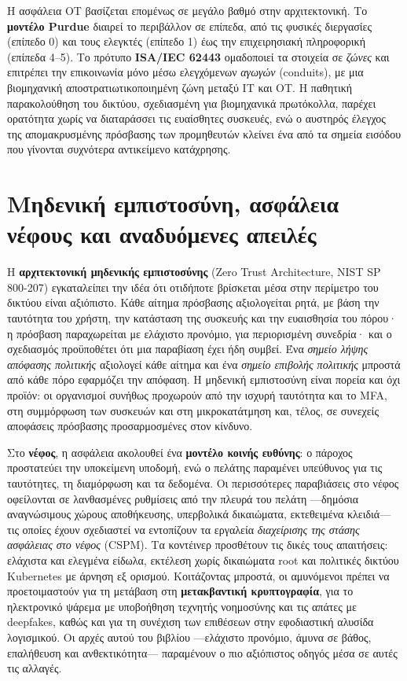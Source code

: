 Η ασφάλεια OT βασίζεται επομένως σε μεγάλο βαθμό στην αρχιτεκτονική. Το \textbf{μοντέλο Purdue} διαιρεί το περιβάλλον σε επίπεδα, από τις φυσικές διεργασίες (επίπεδο 0) και τους ελεγκτές (επίπεδο 1) έως την επιχειρησιακή πληροφορική (επίπεδα 4–5). Το πρότυπο \textbf{ISA/IEC 62443} ομαδοποιεί τα στοιχεία σε \emph{ζώνες} και επιτρέπει την επικοινωνία μόνο μέσω ελεγχόμενων \emph{αγωγών} (conduits), με μια βιομηχανική αποστρατιωτικοποιημένη ζώνη μεταξύ IT και OT. Η παθητική παρακολούθηση του δικτύου, σχεδιασμένη για βιομηχανικά πρωτόκολλα, παρέχει ορατότητα χωρίς να διαταράσσει τις ευαίσθητες συσκευές, ενώ ο αυστηρός έλεγχος της απομακρυσμένης πρόσβασης των προμηθευτών κλείνει ένα από τα σημεία εισόδου που γίνονται συχνότερα αντικείμενο κατάχρησης.

\section{Μηδενική εμπιστοσύνη, ασφάλεια νέφους και αναδυόμενες απειλές}\label{sec:13.7}
Η \textbf{αρχιτεκτονική μηδενικής εμπιστοσύνης} (Zero Trust Architecture, NIST SP 800-207) εγκαταλείπει την ιδέα ότι οτιδήποτε βρίσκεται μέσα στην περίμετρο του δικτύου είναι αξιόπιστο. Κάθε αίτημα πρόσβασης αξιολογείται ρητά, με βάση την ταυτότητα του χρήστη, την κατάσταση της συσκευής και την ευαισθησία του πόρου· η πρόσβαση παραχωρείται με ελάχιστο προνόμιο, για περιορισμένη συνεδρία· και ο σχεδιασμός προϋποθέτει ότι μια παραβίαση έχει ήδη συμβεί. Ένα \emph{σημείο λήψης απόφασης πολιτικής} αξιολογεί κάθε αίτημα και ένα \emph{σημείο επιβολής πολιτικής} μπροστά από κάθε πόρο εφαρμόζει την απόφαση. Η μηδενική εμπιστοσύνη είναι πορεία και όχι προϊόν: οι οργανισμοί συνήθως προχωρούν από την ισχυρή ταυτότητα και το MFA, στη συμμόρφωση των συσκευών και στη μικροκατάτμηση και, τέλος, σε συνεχείς αποφάσεις πρόσβασης προσαρμοσμένες στον κίνδυνο.

Στο \textbf{νέφος}, η ασφάλεια ακολουθεί ένα \textbf{μοντέλο κοινής ευθύνης}: ο πάροχος προστατεύει την υποκείμενη υποδομή, ενώ ο πελάτης παραμένει υπεύθυνος για τις ταυτότητες, τη διαμόρφωση και τα δεδομένα. Οι περισσότερες παραβιάσεις στο νέφος οφείλονται σε λανθασμένες ρυθμίσεις από την πλευρά του πελάτη —δημόσια αναγνώσιμους χώρους αποθήκευσης, υπερβολικά δικαιώματα, εκτεθειμένα κλειδιά— τις οποίες έχουν σχεδιαστεί να εντοπίζουν τα εργαλεία \emph{διαχείρισης της στάσης ασφάλειας στο νέφος} (CSPM). Τα κοντέινερ προσθέτουν τις δικές τους απαιτήσεις: ελάχιστα και ελεγμένα είδωλα, εκτέλεση χωρίς δικαιώματα root και πολιτικές δικτύου Kubernetes με άρνηση εξ ορισμού. Κοιτάζοντας μπροστά, οι αμυνόμενοι πρέπει να προετοιμαστούν για τη μετάβαση στη \textbf{μετακβαντική κρυπτογραφία}, για το ηλεκτρονικό ψάρεμα με υποβοήθηση τεχνητής νοημοσύνης και τις απάτες με deepfakes, καθώς και για τη συνέχιση των επιθέσεων στην εφοδιαστική αλυσίδα λογισμικού. Οι αρχές αυτού του βιβλίου —ελάχιστο προνόμιο, άμυνα σε βάθος, επαλήθευση και ανθεκτικότητα— παραμένουν ο πιο αξιόπιστος οδηγός μέσα σε αυτές τις αλλαγές.


